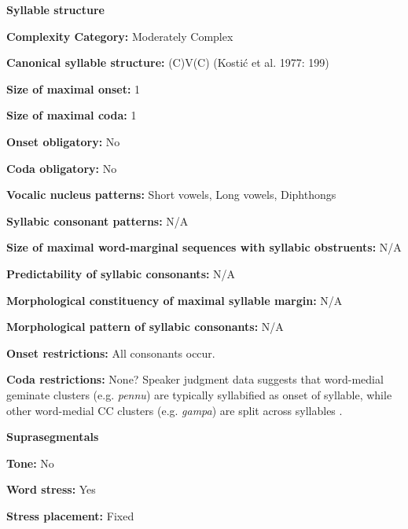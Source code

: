 \textbf{Syllable structure}



\textbf{Complexity Category:} Moderately Complex



\textbf{Canonical syllable structure:} (C)V(C) (Kostić et al. 1977: 199)



\textbf{Size of maximal onset:} 1



\textbf{Size of maximal coda:} 1



\textbf{Onset obligatory:} No



\textbf{Coda obligatory:} No



\textbf{Vocalic nucleus patterns:} Short vowels, Long vowels, Diphthongs



\textbf{Syllabic consonant patterns:} N/A



\textbf{Size of maximal word{}-marginal sequences with syllabic obstruents:} N/A



\textbf{Predictability of syllabic consonants:} N/A



\textbf{Morphological constituency of maximal syllable margin:} N/A



\textbf{Morphological pattern of syllabic consonants:} N/A



\textbf{Onset restrictions:} All consonants occur. 



\textbf{Coda restrictions:} None? Speaker judgment data suggests that word-medial geminate clusters (e.g. \textit{pennu}) are typically syllabified as onset of syllable, while other word-medial CC clusters (e.g. \textit{gampa}) are split across syllables \citep{Sailaja1999}.



\textbf{Suprasegmentals}



\textbf{Tone:} No



\textbf{Word stress:} Yes



\textbf{Stress placement:} Fixed



